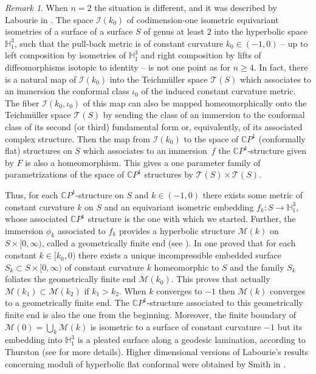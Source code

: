 \documentclass[10pt]{amsart}
\let\mathcal\mathscr
\theoremstyle{definition}
\theoremstyle{remark}
\newtheorem{remark}[theorem]{Remark}
\numberwithin{equation}{section}
\begin{document}
\begin{remark}
When $n=2$ the situation is different, and it was described by Labourie
in \cite{Lab}. The space $\mathcal I(k_0)$
of codimension-one isometric equivariant isometries of a
surface of a surface $S$ of genus at least $2$
into the hyperbolic space $\mathbb H_1^{3}$, such that
the pull-back metric is of constant curvature $k_0\in(-1,0)$ --
up to left composition by isometries of
$\mathbb H_1^{3}$ and right composition by lifts of diffeomorphisms
isotopic to identity -- is not one point as for $n\geq4$.
In fact, there is a natural map of $\mathcal I(k_0)$ into
the Teichmüller space $\mathcal T(S)$ which associates
to an immersion the conformal class $\iota_0$ of the induced
constant curvature metric. The fiber $\mathcal I(k_0,\iota_0)$ of this map
can also be mapped homeomorphically onto the Teichmüller space
$\mathcal T(S)$ by sending the class of an immersion
to the conformal class of its second (or third) fundamental form
or, equivalently, of its associated complex structure. Then
the map from $\mathcal I(k_0)$ to the space of $\mathbb CP^1$ (\ie conformally flat) structures on $S$ which associates to an immersion~$f$ the $\mathbb CP^1$-structure given by $F$ is also a homeomorphism.
This gives a one parameter family of parametrizations of the space of
$\mathbb CP^1$ structures by $\mathcal T(S)\times \mathcal T(S)$.

Thus, for each $\mathbb CP^1$-structure on $S$ and $k\in (-1,0)$
there exists some metric of constant curvature $k$ on $S$ and an
equivariant isometric embedding $f_k:S\to \mathbb H_1^{3}$, whose associated
$\mathbb CP^1$ structure is the one with which we started.
Further, the immersion $\phi_k$ associated to $f_k$ provides
a hyperbolic structure $\mathcal M(k)$ on
$S\times [0,\infty)$, called a geometrically finite end (see \cite{Lab}).
In \cite{Lab,Lab2} one proved that for each constant $k\in [k_0,0)$ there exists a unique incompressible embedded surface $S_{k}\subset S\times [0,\infty)$
of constant curvature $k$ homeomorphic to $S$ and the family $S_{k}$ foliates
the geometrically finite end $\mathcal M(k_0)$.
This proves that actually $\mathcal M(k_1) \subset \mathcal M(k_2)$
if $k_1 > k_2$. When $k$ converges to $-1$ then
$\mathcal M(k)$ converges to a geometrically finite end.
The $\mathbb CP^1$-structure associated to this geometrically finite end is
also the one from the beginning. Moreover, the finite
boundary of $\mathcal M(0)=\bigcup_{k}\mathcal M(k)$ is isometric
to a surface of constant curvature $-1$ but its embedding
into $\mathbb H_1^3$ is a pleated surface
along a geodesic lamination, according to Thurston (see \cite{Lab} for
more details). Higher dimensional versions of Labourie's results
concerning moduli of hyperbolic flat conformal were obtained
by Smith in \cite{Smith}.
\end{remark}
\end{document}

